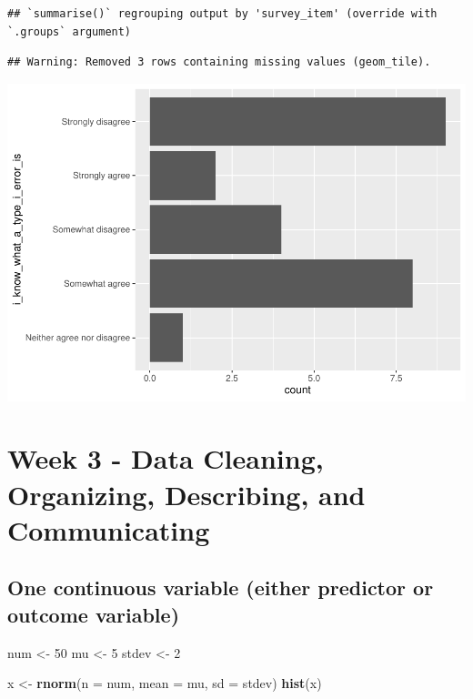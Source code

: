 \documentclass[
]{book}
\newenvironment{Shaded}{\begin{snugshade}}{\end{snugshade}}
\newcommand{\DataTypeTok}[1]{\textcolor[rgb]{0.13,0.29,0.53}{#1}}
\newcommand{\DecValTok}[1]{\textcolor[rgb]{0.00,0.00,0.81}{#1}}
\newcommand{\KeywordTok}[1]{\textcolor[rgb]{0.13,0.29,0.53}{\textbf{#1}}}
\newcommand{\NormalTok}[1]{#1}
\newcommand{\StringTok}[1]{\textcolor[rgb]{0.31,0.60,0.02}{#1}}
\begin{document}
\begin{verbatim}
## `summarise()` regrouping output by 'survey_item' (override with `.groups` argument)
\end{verbatim}

\begin{verbatim}
## Warning: Removed 3 rows containing missing values (geom_tile).
\end{verbatim}

\includegraphics{test_course_notes_files/figure-latex/unnamed-chunk-12-1.pdf}

\hypertarget{week-3---data-cleaning-organizing-describing-and-communicating}{%
\chapter{Week 3 - Data Cleaning, Organizing, Describing, and Communicating}\label{week-3---data-cleaning-organizing-describing-and-communicating}}

\hypertarget{one-continuous-variable-either-predictor-or-outcome-variable}{%
\section{One continuous variable (either predictor or outcome variable)}\label{one-continuous-variable-either-predictor-or-outcome-variable}}

\begin{Shaded}
\begin{Highlighting}[]
\NormalTok{num \textless{}{-}}\StringTok{ }\DecValTok{50}
\NormalTok{mu \textless{}{-}}\StringTok{ }\DecValTok{5}
\NormalTok{stdev \textless{}{-}}\StringTok{ }\DecValTok{2}

\NormalTok{x \textless{}{-}}\StringTok{ }\KeywordTok{rnorm}\NormalTok{(}\DataTypeTok{n =}\NormalTok{ num, }\DataTypeTok{mean =}\NormalTok{ mu, }\DataTypeTok{sd =}\NormalTok{ stdev)}
\KeywordTok{hist}\NormalTok{(x)}
\end{Highlighting}
\end{Shaded}
\end{document}
